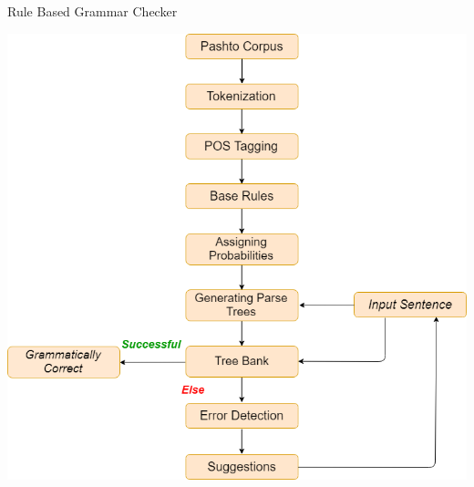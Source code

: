 \documentclass{beamer}
\begin{document}
\begin{frame}{Rule Based Grammar Checker}
\begin{center}
	\includegraphics[scale=0.25]{d.png}	
\end{center}
\end{frame}


\end{document}
